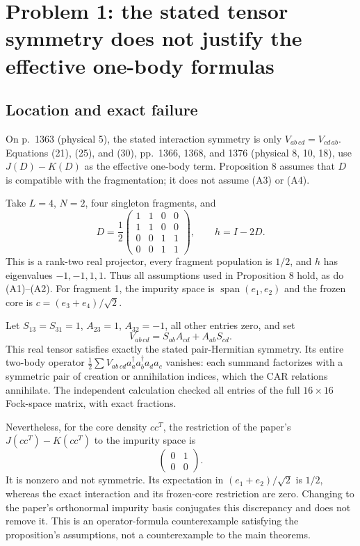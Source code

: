 \documentclass[10pt]{article}
\begin{document}
\section*{Problem 1: the stated tensor symmetry does not justify the effective one-body formulas}
\subsection*{Location and exact failure}
On p. 1363 (physical 5), the stated interaction symmetry is only \(V_{ab\,cd}=V_{cd\,ab}\). Equations (21), (25), and (30), pp. 1366, 1368, and 1376 (physical 8, 10, 18), use \(J(D)-K(D)\) as the effective one-body term. Proposition 8 assumes that \(D\) is compatible with the fragmentation; it does not assume (A3) or (A4).\par
Take \(L=4\), \(N=2\), four singleton fragments, and \[D=\frac12\begin{pmatrix}1&1&0&0\\1&1&0&0\\
 0&0&1&1\\0&0&1&1\end{pmatrix},\qquad h=I-2D.\] This is a rank-two real projector, every fragment population is \(1/2\), and \(h\) has eigenvalues \(-1,-1,1,1\). Thus all assumptions used in Proposition 8 hold, as do (A1)–(A2). For fragment 1, the impurity space is \(\operatorname{span}(e_1,e_2)\) and the frozen core is \(c=(e_3+e_4)/\sqrt2\).\par
Let \(S_{13}=S_{31}=1\), \(A_{23}=1\), \(A_{32}=-1\), all other entries zero, and set \[V_{ab\,cd}=S_{ab}A_{cd}+A_{ab}S_{cd}.\] This real tensor satisfies exactly the stated pair-Hermitian symmetry. Its entire two-body operator \(\frac12\sum V_{ab\,cd}a_a^\dagger a_b^\dagger a_d a_c\) vanishes: each summand factorizes with a symmetric pair of creation or annihilation indices, which the CAR relations annihilate. The independent calculation checked all entries of the full \(16\times16\) Fock-space matrix, with exact fractions.\par
Nevertheless, for the core density \(cc^T\), the restriction of the paper’s \(J(cc^T)-K(cc^T)\) to the impurity space is \[\begin{pmatrix}0&1\\0&0\end{pmatrix}.\] It is nonzero and not symmetric. Its expectation in \((e_1+e_2)/\sqrt2\) is \(1/2\), whereas the exact interaction and its frozen-core restriction are zero. Changing to the paper’s orthonormal impurity basis conjugates this discrepancy and does not remove it. This is an operator-formula counterexample satisfying the proposition’s assumptions, not a counterexample to the main theorems.\par
\end{document}
